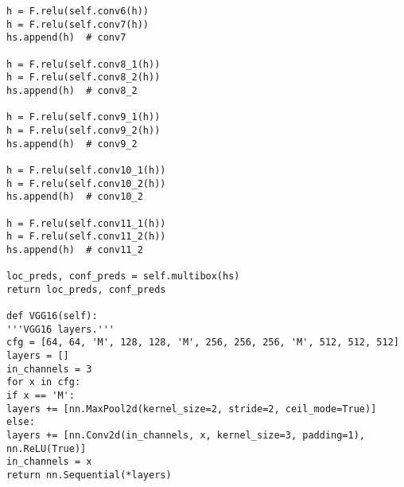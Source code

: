 \begin{lstlisting}[caption={SSD网络模型}]
h = F.relu(self.conv6(h))
h = F.relu(self.conv7(h))
hs.append(h)  # conv7

h = F.relu(self.conv8_1(h))
h = F.relu(self.conv8_2(h))
hs.append(h)  # conv8_2

h = F.relu(self.conv9_1(h))
h = F.relu(self.conv9_2(h))
hs.append(h)  # conv9_2

h = F.relu(self.conv10_1(h))
h = F.relu(self.conv10_2(h))
hs.append(h)  # conv10_2

h = F.relu(self.conv11_1(h))
h = F.relu(self.conv11_2(h))
hs.append(h)  # conv11_2

loc_preds, conf_preds = self.multibox(hs)
return loc_preds, conf_preds

def VGG16(self):
'''VGG16 layers.'''
cfg = [64, 64, 'M', 128, 128, 'M', 256, 256, 256, 'M', 512, 512, 512]
layers = []
in_channels = 3
for x in cfg:
if x == 'M':
layers += [nn.MaxPool2d(kernel_size=2, stride=2, ceil_mode=True)]
else:
layers += [nn.Conv2d(in_channels, x, kernel_size=3, padding=1),
nn.ReLU(True)]
in_channels = x
return nn.Sequential(*layers)

\end{lstlisting}